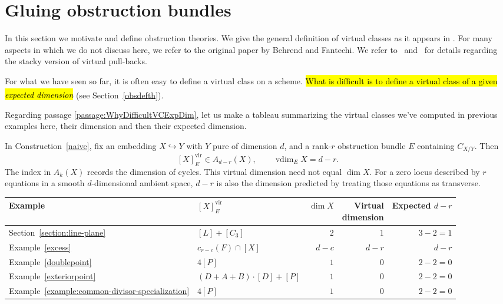 \documentclass[pdftex]{sigma}
\makeatletter
\numberwithin{equation}{section}
\newcommand{\vv}{\mathrm{vir}}
\theoremstyle{plain}
\theoremstyle{definition}
\theoremstyle{remark}
\newcommand{\roundedhighlight}[1]{%
  \begingroup
  \setuloverlap{2pt}%
  \def\SOUL@ulunderline##1{{%
    \setbox\z@\hbox{##1}%
    \rlap{\SOUL@ulcolor{\tikz[overlay,blend mode=darken]{%
      \fill[rounded corners=2pt]
        (-\SOUL@uloverlap,-\SOUL@uldp)
        rectangle (\dimexpr\wd\z@+\SOUL@uloverlap\relax,\SOUL@ulht);%
    }}}%
    \unhcopy\z@
  }}%
  \hl{#1}%
  \endgroup
}
\DeclareRobustCommand{\hlpink}[1]{{\sethlcolor{notepink}\roundedhighlight{#1}}}
\newcounter{passage}
\newcommand{\passagemark}{%
  \refstepcounter{passage}%
  \textsuperscript{\normalfont[\thepassage]}%
}
\makeatother
\begin{document}
\section{Gluing obstruction bundles}\label{gluingobs}
In this section we motivate and define obstruction theories. We give the general definition of virtual classes as it appears in \cite{BerFan}. For many aspects in \cite{BerFan} which we do not discuss here, we refer to the original paper by Behrend and Fantechi. We refer to~\cite{Kstacks} and~\cite{vir-pull} for details regarding the stacky version of virtual pull-backs.

For what we have seen so far, it is often easy to define a virtual class on a scheme. \hlpink{What is difficult is to define a virtual class of a given \emph{expected dimension}}\passagemark\label{passage:WhyDifficultVCExpDim} (see Section~\ref{obsdefth}). 

\begin{ptcb}
Regarding passage \ref{passage:WhyDifficultVCExpDim}, let us make a tableau summarizing the virtual classes we've computed in previous examples here, their dimension and then their expected dimension.

In Construction~\ref{naive}, fix an embedding $X\hookrightarrow Y$ with
$Y$ pure of dimension $d$, and a rank-$r$ obstruction bundle $E$ containing
$C_{X/Y}$. Then
\[
 [X]^{\vv}_E\in A_{d-r}(X),\qquad
 \operatorname{vdim}_E X=d-r.
\]
The index in $A_k(X)$ records the dimension of cycles. This virtual
dimension need not equal $\dim X$. For a zero locus described by $r$
equations in a smooth $d$-dimensional ambient space, $d-r$ is also the
dimension predicted by treating those equations as transverse.

\begingroup
\small
\centering
\renewcommand{\arraystretch}{1.25}
\begin{tabularx}{\linewidth}{@{}l>{\centering\arraybackslash}Xrrr@{}}
\toprule
Example & $[X]^{\vv}_E$ & $\dim X$ &
\shortstack{Virtual\\dimension} &
\shortstack{Expected\\$d-r$}\\
\midrule
Section~\ref{section:line-plane}
  & $[L]+[C_3]$ & $2$ & $1$ & $3-2=1$\\
Example~\ref{excess}
  & $c_{r-c}(F)\cap[X]$ & $d-c$ & $d-r$ & $d-r$\\
Example~\ref{doublepoint}
  & $4[P]$ & $1$ & $0$ & $2-2=0$\\
Example~\ref{exteriorpoint}
  & $(D+A+B)\cdot[D]+[P]$ & $1$ & $0$ & $2-2=0$\\
Example~\ref{example:common-divisor-specialization}
  & $4[P]$ & $1$ & $0$ & $2-2=0$\\
\bottomrule
\end{tabularx}
\endgroup
\end{ptcb}
\end{document}
